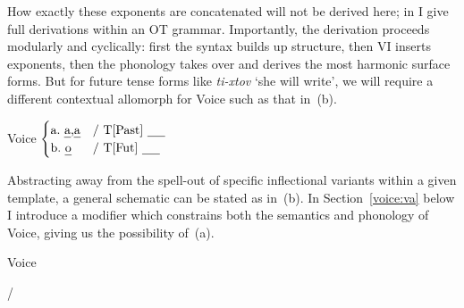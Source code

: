 \begin{exe}
\begin{xlist}
\begin{exe}
\begin{xlist}
\begin{exe}
\begin{xlist}
\begin{exe}
\begin{exe}
\begin{xlist}
\begin{exe}
\begin{xlist}
\begin{exe}
\begin{xlist}
\begin{exe}
\begin{xlist}
\begin{exe}
\begin{xlist}
\begin{exe}
\begin{xlist}
\begin{exe}
\begin{xlist}
\begin{exe}
\begin{xlist}
\begin{exe}
\begin{xlist}
\begin{exe}
\begin{xlist}
\begin{exe}
\begin{xlist}
\begin{exe}
\begin{xlist}
\begin{exe}
\begin{exe}
\begin{xlist}
\begin{exe}
\begin{xlist}
\begin{exe}
\begin{xlist}
\begin{exe}
\begin{xlist}
{\begin{exe}
\begin{xlist}
\begin{exe}
\begin{xlist}
\begin{exe}
\begin{xlist}
\begin{exe}
\begin{xlist}
\begin{xlist}
\begin{xlist}
\begin{exe}
\begin{xlist}
\begin{xlist}
\begin{xlist}
How exactly these exponents are concatenated will not be derived here; in \cite{kastner18nllt} I give full derivations within an OT grammar. Importantly, the derivation proceeds modularly and cyclically: first the syntax builds up structure, then VI inserts exponents, then the phonology takes over and derives the most harmonic surface forms. But for future tense forms like \emph{ti-xtov} `she will write', we will require a different contextual allomorph for Voice such as that in~(\nextx b).
 \begin{exe}
\ex  \label{vi:voice} Voice \lra $\begin{cases} 
		\text{a.~\emph{a},\emph{a}} & \text{/ T[Past] \trace}\\
		\text{b.~\emph{o}} & \text{/ T[Fut] \trace}\\
		\end{cases}$
 \z 

Abstracting away from the spell-out of specific inflectional variants within a given template, a general schematic can be stated as in~(\nextx b). In Section~\ref{voice:va} below I introduce a modifier which constrains both the semantics and phonology of Voice, giving us the possibility of~(\nextx a).
 \begin{exe}
 \ex  Voice {\lra} 
 \begin{xlist} 
 	\ex   {\tpie} / {\trace} {\va} 
 	\ex   {\tkal} 
 \z
\z 


\end{xlist}
\end{exe}
\end{exe}
\end{xlist}
\end{xlist}
\end{xlist}
\end{exe}
\end{xlist}
\end{xlist}
\end{xlist}
\end{exe}
\end{xlist}
\end{exe}
\end{xlist}
\end{exe}
\end{xlist}
\end{exe}}
\end{xlist}
\end{exe}
\end{xlist}
\end{exe}
\end{xlist}
\end{exe}
\end{xlist}
\end{exe}
\end{exe}
\end{xlist}
\end{exe}
\end{xlist}
\end{exe}
\end{xlist}
\end{exe}
\end{xlist}
\end{exe}
\end{xlist}
\end{exe}
\end{xlist}
\end{exe}
\end{xlist}
\end{exe}
\end{xlist}
\end{exe}
\end{xlist}
\end{exe}
\end{xlist}
\end{exe}
\end{xlist}
\end{exe}
\end{xlist}
\end{exe}
\end{exe}
\end{xlist}
\end{exe}
\end{xlist}
\end{exe}
\end{xlist}
\end{exe}

